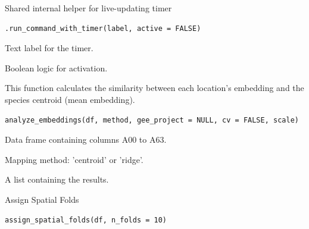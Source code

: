 \documentclass[letterpaper]{book}
\begin{document}
%
\begin{Description}
Shared internal helper for live-updating timer
\end{Description}
%
\begin{Usage}
\begin{verbatim}
.run_command_with_timer(label, active = FALSE)
\end{verbatim}
\end{Usage}
%
\begin{Arguments}
\begin{ldescription}
\item[\code{label}] Text label for the timer.

\item[\code{active}] Boolean logic for activation.
\end{ldescription}
\end{Arguments}
%
\begin{Description}
This function calculates the similarity between each location's embedding and the species centroid (mean embedding).
\end{Description}
%
\begin{Usage}
\begin{verbatim}
analyze_embeddings(df, method, gee_project = NULL, cv = FALSE, scale)
\end{verbatim}
\end{Usage}
%
\begin{Arguments}
\begin{ldescription}
\item[\code{df}] Data frame containing columns A00 to A63.

\item[\code{method}] Mapping method: 'centroid' or 'ridge'.
\end{ldescription}
\end{Arguments}
%
\begin{Value}
A list containing the results.
\end{Value}
%
\begin{Description}
Assign Spatial Folds
\end{Description}
%
\begin{Usage}
\begin{verbatim}
assign_spatial_folds(df, n_folds = 10)
\end{verbatim}
\end{Usage}
\end{document}
